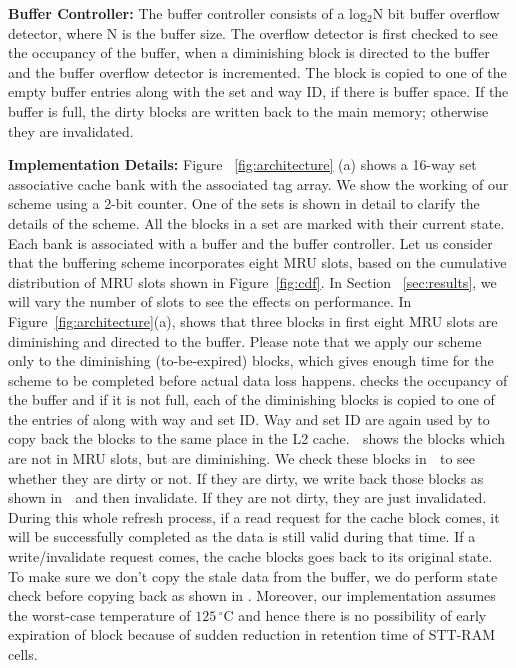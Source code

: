 \noindent\textbf{Buffer Controller:}
The buffer controller consists of a log$_2$N bit buffer overflow detector, where N is the buffer size.
The overflow detector is first checked to see the occupancy of the buffer,
when a diminishing block is directed to the buffer and the buffer overflow detector is incremented.
The block is copied to one of the empty buffer entries along with the set and way ID, if there is
buffer space.
If the buffer is full, the dirty blocks are written back to the main memory; otherwise they are  invalidated.

\noindent\textbf{Implementation Details:} Figure ~\ref{fig:architecture} (a) shows a 16-way set
associative cache bank with the associated tag array. We show the working of our scheme using a 2-bit
counter.  One of the sets is shown in detail to clarify the details of the scheme. All the blocks in
a set are marked with their current state. Each bank is  associated with a buffer and the buffer
controller. Let us consider that the buffering scheme incorporates eight MRU slots, based on the
cumulative distribution of MRU slots shown in Figure~\ref{fig:cdf}. In Section ~\ref{sec:results}, we
will vary the number of slots to see the effects on performance. In Figure~\ref{fig:architecture}(a),
 shows that three blocks in first eight MRU slots are diminishing and directed to the
buffer. Please note that we apply our scheme only to the diminishing (to-be-expired) blocks, which gives enough time for the scheme to be completed before actual data loss happens.  checks the occupancy of the buffer and if it is not full, each of the diminishing
blocks is copied to one of the entries of  along with way and set ID. Way and set ID are
again used by    to copy back the blocks to the same place in the L2 cache.
\textcircled{\raisebox{-.9pt}{A}} shows the blocks which are not in MRU slots, but are diminishing.
We check these blocks in \textcircled{\raisebox{-.9pt}{B}} to see whether they are dirty or not. If
they are dirty, we write back those blocks as shown in \textcircled{\raisebox{-.9pt}{C}} and then
invalidate.  If they are not dirty, they are just invalidated. During this whole refresh process, if a read request for the cache block comes, it will be successfully completed as the data is still valid during that time. If a write/invalidate request comes, the cache blocks goes back to its original state. To make sure we don't copy the stale data
from the buffer, we do perform state check before copying back as shown in . Moreover, our implementation assumes the worst-case temperature of $125\,^{\circ}\mathrm{C}$ and hence there is no possibility of early expiration of block because of sudden reduction in retention time of STT-RAM cells.


